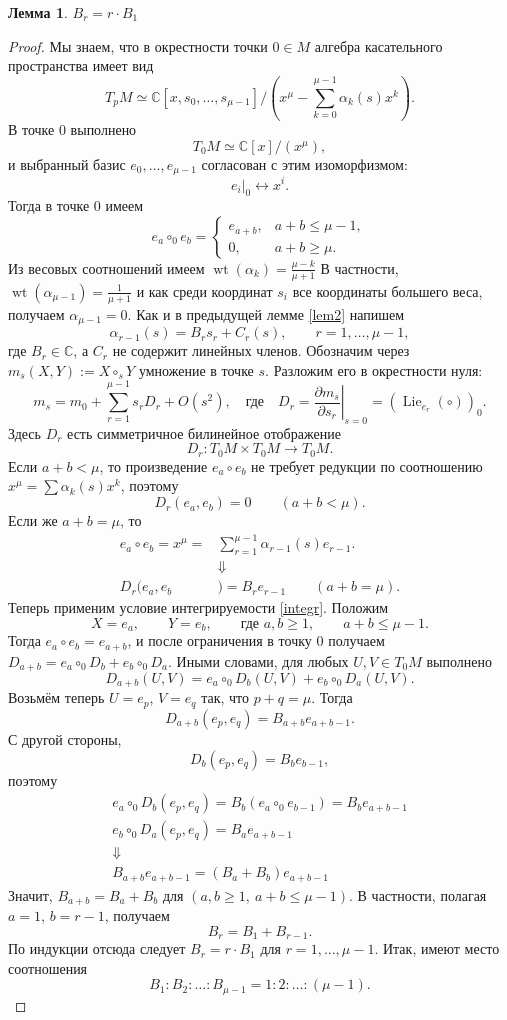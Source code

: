 \documentclass[a4paper, 10pt]{article}
\theoremstyle{plain}
\newtheorem{lem}{Лемма}
\begin{document}
\begin{lem}\label{lem3}
    \(B_r=r \cdot B_1\)
\end{lem}
\begin{proof}
Мы знаем, что в окрестности точки $0 \in M$ алгебра касательного пространства имеет вид
\[
T_pM \simeq
\mathbb C[x,s_0,\ldots,s_{\mu-1}]
\Big/
\left(
x^\mu-\sum_{k=0}^{\mu-1}\alpha_k(s)x^k
\right).
\]
В точке $0$ выполнено
\[
T_0M \simeq \mathbb C[x]/(x^\mu),
\]
и выбранный базис $e_0,\ldots,e_{\mu-1}$ согласован с этим изоморфизмом:
\[
e_i|_0 \longleftrightarrow x^i.
\]
Тогда в точке $0$ имеем
\[
e_a\circ_0 e_b=
\begin{cases}
e_{a+b}, & a+b\leq \mu-1,\\
0, & a+b\geq \mu.
\end{cases}
\]
Из весовых соотношений имеем \(\operatorname{wt}(\alpha_k)=\frac{\mu-k}{\mu+1}\) В частности, \(\operatorname{wt}(\alpha_{\mu-1})=\frac{1}{\mu+1}\) и как среди координат $s_i$ все координаты большего веса, получаем
\(\alpha_{\mu-1}=0.\)
Как и в предыдущей лемме \ref{lem2} напишем
\[\alpha_{r-1}(s)=B_rs_r+C_r(s),\qquad r=1,\ldots,\mu-1,\]
где $B_r\in \mathbb{C}$, а $C_r$ не содержит линейных членов.
Обозначим через \(m_s(X,Y):=X\circ_s Y\) умножение в точке $s$. Разложим его в окрестности нуля:
\[
m_s=m_0+\sum_{r=1}^{\mu-1}s_rD_r+O(s^2),\quad
\text{где} \quad
D_r=
\left.\frac{\partial m_s}{\partial s_r}\right|_{s=0}
=
\left(\operatorname{Lie}_{e_r}(\circ)\right)_0.
\]
Здесь $D_r$ есть симметричное билинейное отображение
\[
D_r:T_0M\times T_0M\to T_0M.
\]
Если $a+b<\mu$, то произведение $e_a\circ e_b$ не требует редукции по соотношению
$x^\mu=\sum\alpha_k(s)x^k$, поэтому
\[
D_r(e_a,e_b)=0
\qquad
(a+b<\mu).
\]
Если же $a+b=\mu$, то
\begin{align*}
e_a\circ e_b=x^\mu=&\sum_{r=1}^{\mu-1}\alpha_{r-1}(s)e_{r-1}.\\
&\Downarrow\\
D_r(e_a,e_b&)=B_re_{r-1}\qquad(a+b=\mu).
\end{align*}
Теперь применим условие интегрируемости \ref{integr}. Положим
\[
X=e_a,\qquad Y=e_b,\qquad
\text{где }
a,b\geq 1,\qquad a+b\leq \mu-1.
\]
Тогда $e_a\circ e_b=e_{a+b}$, и после ограничения в точку $0$ получаем
\(D_{a+b} = e_a\circ_0D_b+e_b\circ_0 D_a.\)
Иными словами, для любых $U,V \in T_0M$ выполнено
\[D_{a+b}(U,V) = e_a\circ_0D_b(U,V)+e_b\circ_0D_a(U,V).\]
Возьмём теперь $U=e_p$, $V=e_q$ так, что \(p+q=\mu.\)
Тогда
\[D_{a+b}(e_p,e_q)=B_{a+b}e_{a+b-1}.\]
С другой стороны,\[D_b(e_p,e_q)=B_be_{b-1},\]
поэтому
\begin{gather*}
    e_a\circ_0D_b(e_p,e_q)=B_b(e_a\circ_0e_{b-1})=B_be_{a+b-1}\\
    e_b\circ_0 D_a(e_p,e_q)=B_a e_{a+b-1}\\
    \Downarrow\\
    B_{a+b}e_{a+b-1}=(B_a+B_b)e_{a+b-1}
\end{gather*}
Значит, \(B_{a+b}=B_a+B_b\text{ для }(a,b\geq 1,\ a+b\leq \mu-1).\)
В частности, полагая $a=1$, $b=r-1$, получаем
\[
B_r=B_1+B_{r-1}.
\]
По индукции отсюда следует \(B_r=r \cdot B_1\) для \(r=1,\ldots,\mu-1.\)
Итак, имеют место соотношения
\[
B_1:B_2:\dots:B_{\mu-1}
=
1:2:\dots:(\mu-1).
\]
\end{proof}
\end{document}
